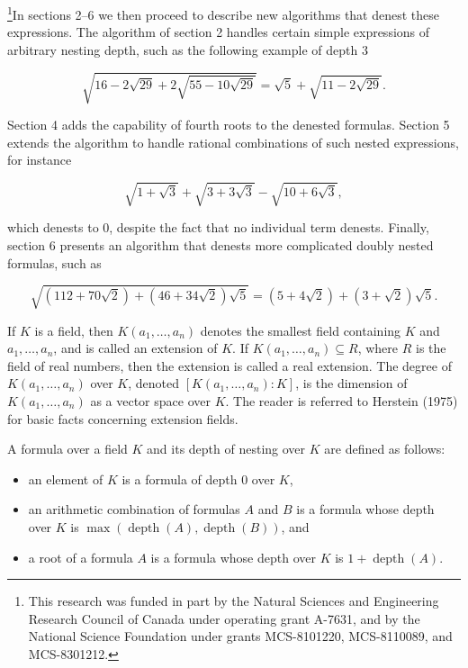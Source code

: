 \documentclass[11pt,letterpaper]{article}
\begin{document}
\footnote{This research was funded in part by the Natural Sciences and Engineering Research Council of Canada under operating grant A-7631, and by the National Science Foundation under grants MCS-8101220, MCS-8110089, and MCS-8301212.}In sections 2--6 we then proceed to describe new algorithms that denest these expressions. The algorithm of section 2 handles certain simple expressions of arbitrary nesting depth, such as the following example of depth 3

\[
\sqrt{16-2 \sqrt{29}+2 \sqrt{55-10 \sqrt{29}}}=\sqrt{5}+\sqrt{11-2 \sqrt{29}} .
\]

Section 4 adds the capability of fourth roots to the denested formulas. Section 5 extends the algorithm to handle rational combinations of such nested expressions, for instance

\[
\sqrt{1+\sqrt{3}}+\sqrt{3+3 \sqrt{3}}-\sqrt{10+6 \sqrt{3}},
\]

which denests to 0, despite the fact that no individual term denests. Finally, section 6 presents an algorithm that denests more complicated doubly nested formulas, such as

\[
\sqrt{(112+70 \sqrt{2})+(46+34 \sqrt{2}) \sqrt{5}}=(5+4 \sqrt{2})+(3+\sqrt{2}) \sqrt{5} .
\]

If $K$ is a field, then $K\left(a_{1}, \ldots, a_{n}\right)$ denotes the smallest field containing $K$ and $a_{1}, \ldots, a_{n}$, and is called an extension of $K$. If $K\left(a_{1}, \ldots, a_{n}\right) \subseteq R$, where $R$ is the field of real numbers, then the extension is called a real extension. The degree of $K\left(a_{1}, \ldots, a_{n}\right)$ over $K$, denoted $\left[K\left(a_{1}, \ldots, a_{n}\right): K\right]$, is the dimension of $K\left(a_{1}, \ldots, a_{n}\right)$ as a vector space over $K$. The reader is referred to Herstein (1975) for basic facts concerning extension fields.

A formula over a field $K$ and its depth of nesting over $K$ are defined as follows:

\begin{itemize}
  \item[1.] an element of $K$ is a formula of depth 0 over $K$,
  \item[2.] an arithmetic combination of formulas $A$ and $B$ is a formula whose depth over $K$ is $\max (\operatorname{depth}(A), \operatorname{depth}(B))$, and
  \item[3.] a root of a formula $A$ is a formula whose depth over $K$ is $1+\operatorname{depth}(A)$.
\end{itemize}
\end{document}
